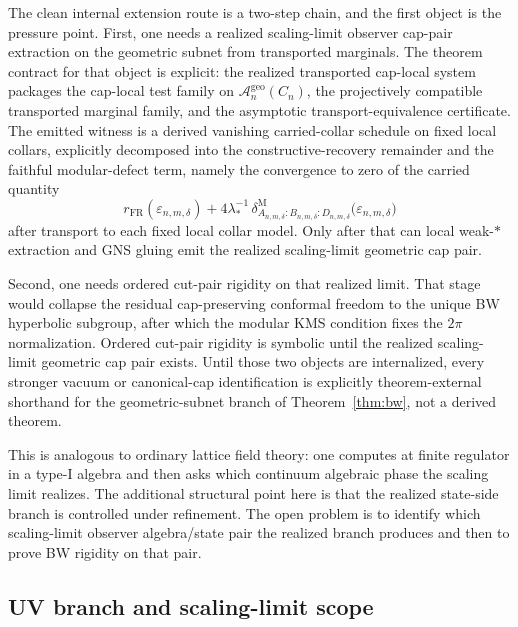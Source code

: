 \documentclass[11pt]{article}
\begin{document}
The clean internal extension route is a two-step chain, and the first object is the pressure point. First, one needs a realized scaling-limit observer cap-pair extraction on the geometric subnet from transported marginals. The theorem contract for that object is explicit: the realized transported cap-local system packages the cap-local test family on \(\mathcal A_n^{\mathrm{geo}}(C_n)\), the projectively compatible transported marginal family, and the asymptotic transport-equivalence certificate. The emitted witness is a derived vanishing carried-collar schedule on fixed local collars, explicitly decomposed into the constructive-recovery remainder and the faithful modular-defect term, namely the convergence to zero of the carried quantity
\[
r_{\mathrm{FR}}(\varepsilon_{n,m,\delta})
+
4\lambda_\ast^{-1}\,
\delta^{\mathrm M}_{A_{n,m,\delta}:B_{n,m,\delta}:D_{n,m,\delta}}
\bigl(\varepsilon_{n,m,\delta}\bigr)
\]
after transport to each fixed local collar model. Only after that can local weak-\(*\) extraction and GNS gluing emit the realized scaling-limit geometric cap pair.

Second, one needs ordered cut-pair rigidity on that realized limit. That stage would collapse the residual cap-preserving conformal freedom to the unique BW hyperbolic subgroup, after which the modular KMS condition fixes the \(2\pi\) normalization. Ordered cut-pair rigidity is symbolic until the realized scaling-limit geometric cap pair exists. Until those two objects are internalized, every stronger vacuum or canonical-cap identification is explicitly theorem-external shorthand for the geometric-subnet branch of Theorem~\ref{thm:bw}, not a derived theorem.

This is analogous to ordinary lattice field theory: one computes at finite regulator in a type-I algebra and then asks which continuum algebraic phase the scaling limit realizes. The additional structural point here is that the realized state-side branch is controlled under refinement. The open problem is to identify which scaling-limit observer algebra/state pair the realized branch produces and then to prove BW rigidity on that pair.
\subsection{UV branch and scaling-limit scope}
\end{document}
